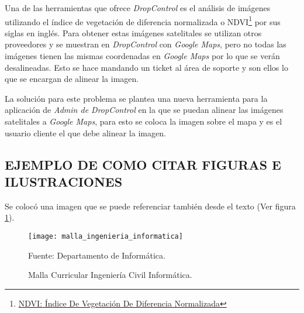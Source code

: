 Una de las herramientas que ofrece \textit{DropControl} es el análisis de imágenes utilizando 
el índice de vegetación de diferencia normalizada o NDVI\footnote{\href{https://eos.com/es/make-an-analysis/ndvi/}{NDVI: Índice De Vegetación De Diferencia Normalizada}} por sus siglas en inglés. Para obtener estas imágenes satelitales
se utilizan otros proveedores y se muestran en \textit{DropControl} con \textit{Google Maps}, pero no todas las imágenes tienen
las mismas coordenadas en \textit{Google Maps} por lo que se verán desalineadas. Esto se hace mandando un ticket al área de soporte
y son ellos lo que se encargan de alinear la imagen.

La solución para este problema se plantea una nueva herramienta para la aplicación de \textit{Admin de DropControl} en la que 
se puedan alinear las imágenes satelitales a \textit{Google Maps}, para esto se coloca la imagen sobre el mapa y es el usuario cliente
el que debe alinear la imagen.

\subsection{EJEMPLO DE COMO CITAR FIGURAS E ILUSTRACIONES}

Se colocó una imagen que se puede referenciar también desde el texto (Ver figura \ref{fig:malla}).

\begin{figure}[h]
\centering
\texttt{[image: malla\_ingenieria\_informatica]}
\caption{\label{fig:malla} Malla Curricular Ingeniería Civil Informática.} Fuente: Departamento de Informática.
\end{figure}
